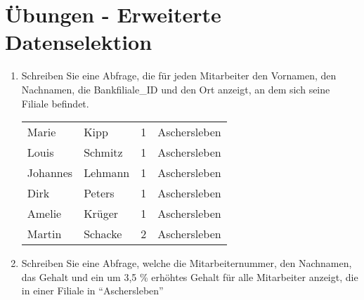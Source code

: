 \clearpage
    \section{Übungen - Erweiterte Datenselektion}
      \begin{enumerate}
        \item Schreiben Sie eine Abfrage, die für jeden Mitarbeiter den
        Vornamen, den Nachnamen, die Bankfiliale\_ID und den Ort anzeigt, an dem
        sich seine Filiale befindet.
        \begin{center}
          \begin{small}
            \tablehead{}
            \begin{msoraclesql}
              \begin{supertabular}{llrl}
                Marie & Kipp & 1 & Aschersleben \\
                Louis & Schmitz & 1 & Aschersleben \\
                Johannes & Lehmann & 1 & Aschersleben \\
                Dirk & Peters & 1 & Aschersleben \\
                Amelie & Krüger & 1 & Aschersleben \\
                Martin & Schacke & 2 & Aschersleben \\
              \end{supertabular}
            \end{msoraclesql}
          \end{small}
        \end{center}
        \item Schreiben Sie eine Abfrage, welche die Mitarbeiternummer, den
        Nachnamen, das Gehalt und ein um 3,5 \% erhöhtes Gehalt für alle
        Mitarbeiter anzeigt, die in einer Filiale in \enquote{Aschersleben}

\end{enumerate}
